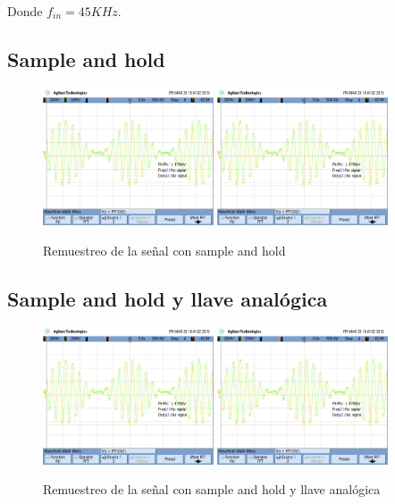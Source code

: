 \documentclass[../../ASSD_TP1_G7.tex]{subfiles}
\begin{document}
Donde $f_{in}=45KHz$.

\subsection*{Sample and hold}
\begin{figure}[H]
\centering
{}
{\includegraphics[width=0.45\textwidth]{figures/syh_ptp_7re.png}}
{\includegraphics[width=0.45\textwidth]{figures/syh_ptp_7re.png}}
\caption{Remuestreo de la se\~nal con sample and hold}
\end{figure}

\subsection*{Sample and hold y llave analógica}
\begin{figure}[H]
\centering
{}
{\includegraphics[width=0.45\textwidth]{figures/syh_ptp_7re.png}}
{\includegraphics[width=0.45\textwidth]{figures/syh_ptp_7re.png}}
\caption{Remuestreo de la se\~nal con sample and hold y llave analógica}
\end{figure}
\end{document}
